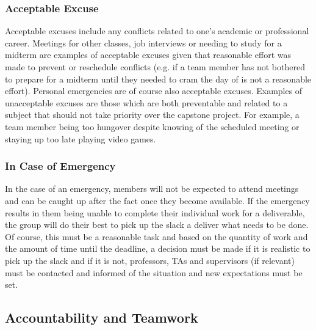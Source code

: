 \documentclass{article}
\begin{document}
\subsubsection*{Acceptable Excuse}


\par{Acceptable excuses include any conflicts related to one's academic or professional career. Meetings for other classes, job interviews or
needing to study for a midterm are examples of acceptable excuses given that reasonable effort was made to prevent or reschedule conflicts (e.g. if a team member
has not bothered to prepare for a midterm until they needed to cram the day of is not a reasonable effort). Personal emergencies are of course also acceptable
excuses. Examples of unacceptable excuses are those which are both preventable and related to a subject that should not take priority over the capstone project.
For example, a team member being too hungover despite knowing of the scheduled meeting or staying up too late playing video games.}

\subsubsection*{In Case of Emergency}

\par{ In the case of an emergency, members will not be expected to attend meetings and can be caught up after the fact once they become available. 
If the emergency results in them being unable to complete their individual work for a deliverable, the group will do their best to pick up the slack
a deliver what needs to be done. Of course, this must be a reasonable task and based on the quantity of work and the amount of time until the deadline,
a decision must be made if it is realistic to pick up the slack and if it is not, professors, TAs and supervisors (if relevant) must be contacted and informed
of the situation and new expectations must be set.}


\subsection*{Accountability and Teamwork}
\end{document}
